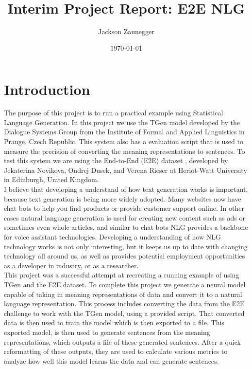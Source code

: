 \documentclass[12pt]{article}
\title{ Interim Project Report: E2E NLG }
\author{ Jackson Zaunegger }
\date{\today}
\begin{document}
\maketitle	 
\pagebreak
\section{Introduction}
The purpose of this project is to run a practical example using Statistical Language Generation. In this project we use the TGen model \cite{TGen} developed by the Dialogue Systems Group from the Institute of Formal and Applied Linguistics in Prauge, Czech Republic. This system also has a evaluation script that is used to measure the precision of converting the meaning representations to sentences. To test this system we are using the End-to-End (E2E) dataset \cite{E2E}, developed by Jekaterina Novikova, Ondrej Dusek, and Verena Rieser at Heriot-Watt University in Edinburgh, United Kingdom. \\

I believe that developing a understand of how text generation works is important, because text generation is being more widely adopted. Many websites now have chat bots to help you find products or provide customer support online. In other cases natural language generation is used for creating new content such as ads or sometimes even whole articles, and similar to chat bots NLG provides a backbone for voice assistant technologies. Developing a understanding of how NLG technology works is not only interesting, but it keeps us up to date with changing technology all around us, as well as provides potential employment opportunities as a developer in industry, or as a researcher. \\

This project was a successful attempt at recreating a running example of using TGen and the E2E dataset. To complete this project we generate a neural model capable of taking in meaning representations of data and convert it to a natural language representation. This process includes converting the data from the E2E challenge to work with the TGen model, using a provided script. That converted data is then used to train the model which is then exported to a file. This exported model, is then used to generate sentences from the meaning representations, which outputs a file of these generated sentences. After a quick reformatting of these outputs, they are used to calculate various metrics to analyze how well this model learns the data and can generate sentences. \\
\end{document}
